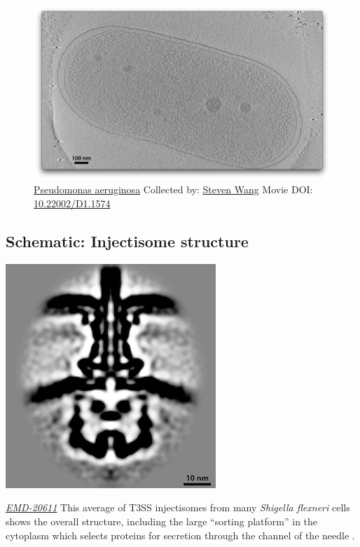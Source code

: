 \documentclass[]{tufte-book}
\begin{document}
\begin{figure}
\includegraphics{movie_stills/9_4} \caption[\protect\hyperlink{tree}{Pseudomonas aeruginosa} Collected by:
\protect\hyperlink{steven_wang}{Steven Wang} Movie DOI:
\href{https://doi.org/10.22002/D1.1574}{10.22002/D1.1574}]{\protect\hyperlink{tree}{Pseudomonas aeruginosa} Collected by:
\protect\hyperlink{steven_wang}{Steven Wang} Movie DOI:
\href{https://doi.org/10.22002/D1.1574}{10.22002/D1.1574}}\label{fig:9-4}
\end{figure}

\hypertarget{Injectisome_structure}{\subsection*{Schematic: Injectisome
structure}\label{Injectisome_structure}}

\includegraphics{img/schematics/9_4_1}

\href{https://www.ebi.ac.uk/pdbe/entry/emdb/EMD-20611}{\emph{EMD-20611}}
This average of T3SS injectisomes from many \emph{Shigella flexneri}
cells shows the overall structure, including the large ``sorting
platform'' in the cytoplasm which selects proteins for secretion through
the channel of the needle \citep{tachiyama2019}.
\end{document}
